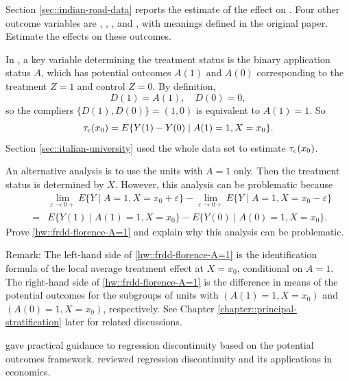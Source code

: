 \begin{HomeworkProblem}\label{exr:24-2}

Section \ref{sec::indian-road-data} reports the estimate of the effect on . Four other outcome variables are , , , and , with meanings defined in the original paper. Estimate the effects on these outcomes.



\end{HomeworkProblem}

\begin{HomeworkProblem}\label{exr:24-3}

In \citet{li2015evaluating}, a key variable determining the treatment status is the binary application status $A$, which has potential outcomes $A(1)$ and $A(0)$ corresponding to the treatment $Z=1$ and control $Z=0$. By definition,
\[
D(1) = A(1), \quad D(0) = 0,
\]
so the compliers $\{ D(1), D(0) \} = (1,0)$ is equivalent to $A(1) = 1$. So
\[
\tau_{\textup{c}}(x_0) = E\{ Y(1) - Y(0) \mid A(1) = 1, X = x_0 \}.
\]
Section \ref{sec::italian-university} used the whole data set to estimate $\tau_{\textup{c}}(x_0)$.

An alternative analysis is to use the units with $A=1$ only. Then the treatment status is determined by $X$. However, this analysis can be problematic because
\begin{eqnarray}
&& \lim_{\varepsilon \rightarrow 0+} E\{ Y \mid A  = 1, X = x_0 + \varepsilon \} -\lim_{\varepsilon \rightarrow 0+}  E\{ Y \mid A  = 1, X = x_0- \varepsilon  \}  \nonumber  \\
&=& E\{ Y(1) \mid A(1)  = 1,   X = x_0   \} -  E\{ Y(0) \mid A(0)  = 1,   X = x_0   \} .\label{hw::frdd-florence-A=1}
\end{eqnarray}
Prove \eqref{hw::frdd-florence-A=1} and explain why this analysis can be problematic.


Remark:
The left-hand side of \eqref{hw::frdd-florence-A=1} is the identification formula of the local average treatment effect at $X=x_0$, conditional on $A=1$. The right-hand side of \eqref{hw::frdd-florence-A=1} is the difference in means of the potential outcomes for the subgroups of units with $(A(1)  = 1,   X = x_0 )$ and $(A(0)  = 1,   X = x_0)$, respectively.
See Chapter \ref{chapter::principal-stratification} later for related discussions.




\end{HomeworkProblem}

\begin{HomeworkProblem}\label{exr:24-4}

\citet{imbens2008regression} gave practical guidance to regression discontinuity based on the potential outcomes framework. \citet{lee2010regression} reviewed regression discontinuity and its applications in economics.

\end{HomeworkProblem}
